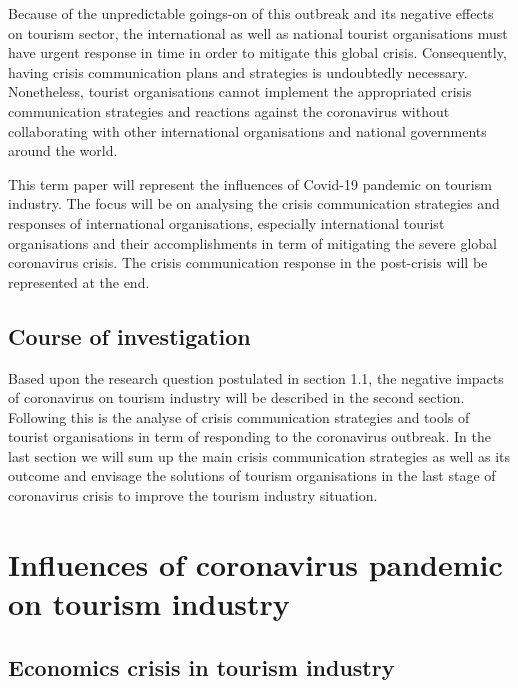 \documentclass[draft=false
              ,paper=a4
              ,twoside=false
              ,fontsize=12pt
              ,headsepline
              ,BCOR10mm
              ,DIV11
              ]{scrbook}
\begin{document}
Because of the unpredictable goings-on of this outbreak and its negative effects on tourism sector, the international as well as national tourist organisations must have urgent response in time in order to mitigate this global crisis. Consequently, having  crisis communication plans and strategies is undoubtedly necessary. Nonetheless, tourist organisations cannot implement the appropriated crisis communication strategies and reactions against the coronavirus without collaborating with other international organisations and national governments around the world.

This term paper will represent the influences of Covid-19 pandemic on tourism industry. The focus will be on analysing the crisis communication strategies and responses of international organisations, especially international tourist organisations and their accomplishments  in term of mitigating the severe global coronavirus crisis. The crisis communication response in the post-crisis will be represented at the end.

\vspace{12pt}
\section{Course of investigation}
\vspace{6pt}

Based upon the research question postulated in section 1.1, the negative impacts of coronavirus on tourism industry will be described in the second section. Following this is the analyse of crisis communication strategies and tools of tourist organisations in term of responding to the coronavirus outbreak. In the last section we will sum up the main crisis communication strategies as well as its outcome and envisage the solutions of tourism organisations in the last stage of coronavirus crisis to improve the tourism industry situation.

\vspace{12pt}
\chapter{Influences of coronavirus pandemic on tourism industry}
\vspace{6pt}
\section{Economics crisis in tourism industry}
\vspace{6pt}
\end{document}
